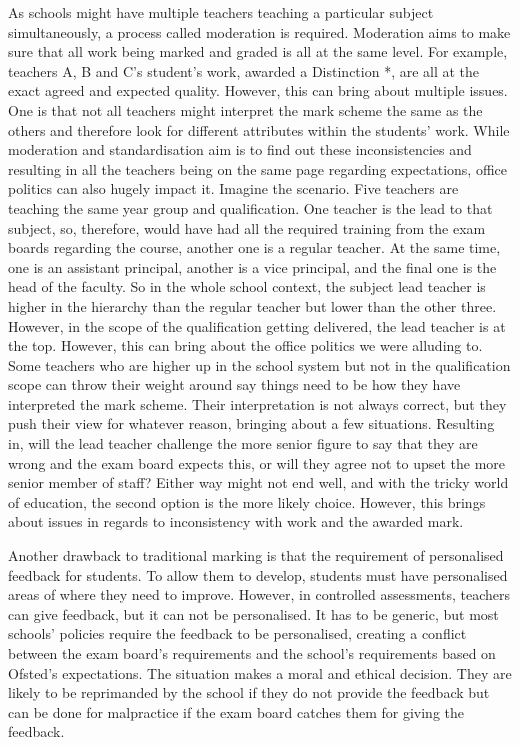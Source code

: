 		As schools might have multiple teachers teaching a particular subject simultaneously, a process called moderation is required. Moderation aims to make sure that all work being marked and graded is all at the same level. For example, teachers A, B and C's student's work, awarded a Distinction *, are all at the exact agreed and expected quality. However, this can bring about multiple issues. One is that not all teachers might interpret the mark scheme the same as the others and therefore look for different attributes within the students' work. While moderation and standardisation aim is to find out these inconsistencies and resulting in all the teachers being on the same page regarding expectations, office politics can also hugely impact it. Imagine the scenario. Five teachers are teaching the same year group and qualification. One teacher is the lead to that subject, so, therefore, would have had all the required training from the exam boards regarding the course, another one is a regular teacher. At the same time, one is an assistant principal, another is a vice principal, and the final one is the head of the faculty. So in the whole school context, the subject lead teacher is higher in the hierarchy than the regular teacher but lower than the other three. However, in the scope of the qualification getting delivered, the lead teacher is at the top. However, this can bring about the office politics we were alluding to. Some teachers who are higher up in the school system but not in the qualification scope can throw their weight around say things need to be how they have interpreted the mark scheme. Their interpretation is not always correct, but they push their view for whatever reason, bringing about a few situations. Resulting in, will the lead teacher challenge the more senior figure to say that they are wrong and the exam board expects this, or will they agree not to upset the more senior member of staff? Either way might not end well, and with the tricky world of education, the second option is the more likely choice. However, this brings about issues in regards to inconsistency with work and the awarded mark.
		
		Another drawback to traditional marking is that the requirement of personalised feedback for students. To allow them to develop, students must have personalised areas of where they need to improve. However, in controlled assessments, teachers can give feedback, but it can not be personalised. It has to be generic, but most schools' policies require the feedback to be personalised, creating a conflict between the exam board's requirements and the school's requirements based on Ofsted's expectations. The situation makes a moral and ethical decision. They are likely to be reprimanded by the school if they do not provide the feedback but can be done for malpractice if the exam board catches them for giving the feedback.
		
